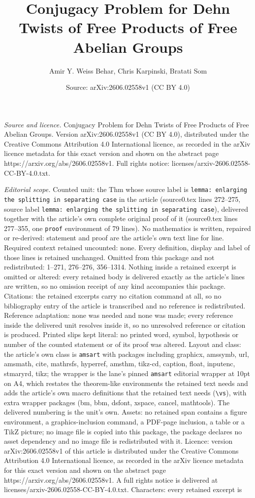 \documentclass[10pt,a4paper]{amsart}
\title[Conjugacy Problem for Dehn Twists of Free Products of Free A]{Conjugacy Problem for Dehn Twists of Free Products of Free Abelian Groups}
\author{Amir Y. Weiss Behar, Chris Karpinski, Bratati Som}
\date{Source: arXiv:2606.02558v1 (CC BY 4.0)}
\begin{document}
\maketitle

\noindent\emph{Source and licence.} Conjugacy Problem for Dehn Twists of Free Products of Free Abelian Groups. Version arXiv:2606.02558v1 (CC BY 4.0), distributed under the Creative Commons Attribution 4.0 International licence, as recorded in the arXiv licence metadata for this exact version and shown on the abstract page https://arxiv.org/abs/2606.02558v1. Full rights notice: licenses/arxiv-2606.02558-CC-BY-4.0.txt.\par\smallskip

\noindent\textit{Editorial scope.} Counted unit: the Thm whose source label is \texttt{lemma: enlarging the splitting in separating case} in the article (source0.tex lines 272--275, source label \texttt{lemma: enlarging the splitting in separating case}), delivered together with the article's own complete original proof of it (source0.tex lines 277--355, one \texttt{proof} environment of 79 lines). No mathematics is written, repaired or re-derived: statement and proof are the article's own text line for line. Required context retained uncounted: none. Every definition, display and label of those lines is retained unchanged. Omitted from this package and not redistributed: 1--271, 276--276, 356--1314. Nothing inside a retained excerpt is omitted or altered: every retained body is delivered exactly as the article's lines are written, so no omission receipt of any kind accompanies this package. Citations: the retained excerpts carry no citation command at all, so no bibliography entry of the article is transcribed and no reference is redistributed. Reference adaptation: none was needed and none was made; every reference inside the delivered unit resolves inside it, so no unresolved reference or citation is produced. Printed slips kept literal: no printed word, symbol, hypothesis or number of the counted statement or of its proof was altered. Layout and class: the article's own class is \texttt{amsart} with packages including graphicx, amssymb, url, amsmath, cite, mathrsfs, hyperref, amsthm, tikz-cd, caption, float, inputenc, stmaryrd, tikz; the wrapper is the lane's pinned \texttt{amsart} editorial wrapper at 10pt on A4, which restates the theorem-like environments the retained text needs and adds the article's own macro definitions that the retained text needs (\texttt{\textbackslash vs}), with extra wrapper packages (bm, bbm, dsfont, xspace, cancel, mathtools). The delivered numbering is the unit's own. Assets: no retained span contains a figure environment, a graphics-inclusion command, a PDF-page inclusion, a table or a TikZ picture; no image file is copied into this package, the package declares no asset dependency and no image file is redistributed with it. Licence: version arXiv:2606.02558v1 of this article is distributed under the Creative Commons Attribution 4.0 International licence, as recorded in the arXiv licence metadata for this exact version and shown on the abstract page https://arxiv.org/abs/2606.02558v1. A full rights notice is delivered at licenses/arxiv-2606.02558-CC-BY-4.0.txt. Characters: every retained excerpt is 
\end{document}
